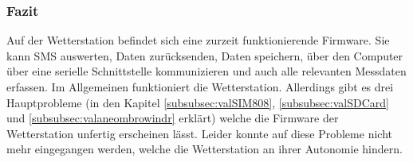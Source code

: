\subsubsection{Fazit}
\label{subsubsec:fwfazit}
Auf der Wetterstation befindet sich eine zurzeit funktionierende Firmware. Sie kann SMS auswerten, Daten zurücksenden, Daten speichern, über den Computer über eine serielle Schnittstelle kommunizieren und auch alle relevanten Messdaten erfassen. Im Allgemeinen funktioniert die Wetterstation. Allerdings gibt es drei Hauptprobleme (in den Kapitel \ref{subsubsec:valSIM808}, \ref{subsubsec:valSDCard} und \ref{subsubsec:valaneombrowindr} erklärt) welche die Firmware der Wetterstation unfertig erscheinen lässt. Leider konnte auf diese Probleme nicht mehr eingegangen werden, welche die Wetterstation an ihrer Autonomie hindern.\\